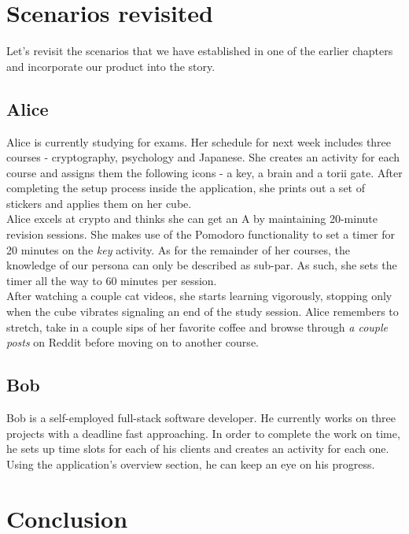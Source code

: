 \documentclass{article}
\begin{document}
\newpage

\section{Scenarios revisited}

Let's revisit the scenarios that we have established in one of the earlier chapters and incorporate our product into the story.

\subsection{Alice}

Alice is currently studying for exams. Her schedule for next week includes three courses - cryptography, psychology and Japanese. She creates an activity for each course and assigns them the following icons - a key, a brain and a torii gate. After completing the setup process inside the application, she prints out a set of stickers and applies them on her cube.\\

Alice excels at crypto and thinks she can get an A by maintaining 20-minute revision sessions. She makes use of the Pomodoro functionality to set a timer for 20 minutes on the \textit{key} activity. As for the remainder of her courses, the knowledge of our persona can only be described as sub-par. As such, she sets the timer all the way to 60 minutes per session.\\

After watching a couple cat videos, she starts learning vigorously, stopping only when the cube vibrates signaling an end of the study session. Alice remembers to stretch, take in a couple sips of her favorite coffee and browse through \textit{a couple posts} on Reddit before moving on to another course.

\subsection{Bob}

Bob is a self-employed full-stack software developer. He currently works on three projects with a deadline fast approaching. In order to complete the work on time, he sets up time slots for each of his clients and creates an activity for each one. Using the application's overview section, he can keep an eye on his progress.

\section{Conclusion}
\end{document}
